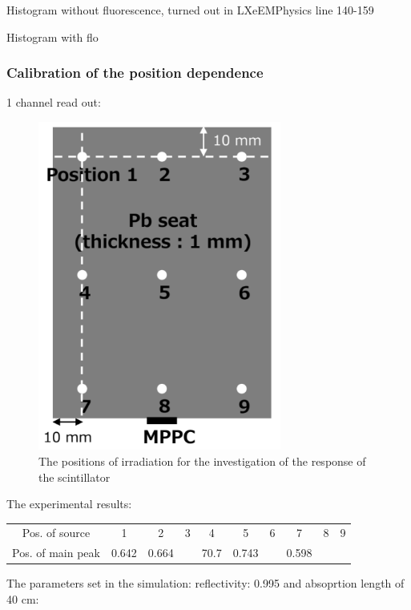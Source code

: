 \documentclass[12pt, a4paper,titlepage]{article}
\numberwithin{equation}{section}
\numberwithin{figure}{section}
\begin{document}
Histogram without fluorescence, turned out in LXeEMPhysics line 140-159

Histogram with flo


\subsubsection{Calibration of the position dependence}



1 channel read out:

\begin{figure}
\centering
\includegraphics[width=80.0mm]{images/positions.png}
\caption{The positions of irradiation for the investigation of the response of the scintillator}
\end{figure}

The experimental results:

\begin{center}
\begin{tabular}{ |c|c|c|c|c|c|c|c|c|c| } 
 \hline
  Pos. of source & 1 & 2 & 3 & 4 & 5 & 6 & 7 & 8 & 9 \\ 
  Pos. of main peak & 0.642 & 0.664 & & 70.7 & 0.743 & & 0.598 & &  \\ 
 \hline
\end{tabular}
\end{center}

The parameters set in the simulation: reflectivity: 0.995 and absoprtion length of
40 cm:
\end{document}
